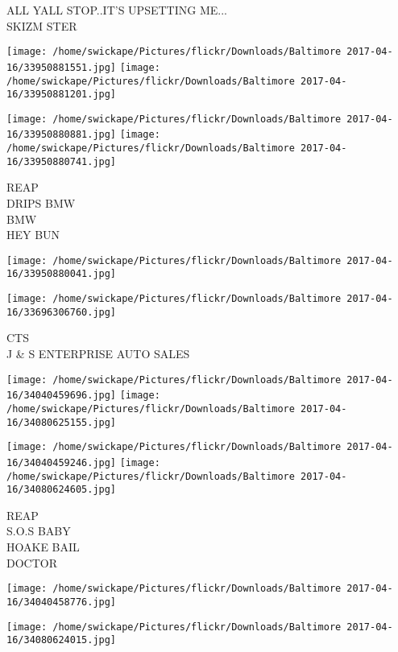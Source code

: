 \documentclass[10pt,letterpaper]{article}
\begin{document}
ALL YALL STOP..IT'S UPSETTING ME...\\
SKIZM STER\\
\pagebreak

\texttt{[image: /home/swickape/Pictures/flickr/Downloads/Baltimore 2017-04-16/33950881551.jpg]}
\texttt{[image: /home/swickape/Pictures/flickr/Downloads/Baltimore 2017-04-16/33950881201.jpg]}

\texttt{[image: /home/swickape/Pictures/flickr/Downloads/Baltimore 2017-04-16/33950880881.jpg]}
\texttt{[image: /home/swickape/Pictures/flickr/Downloads/Baltimore 2017-04-16/33950880741.jpg]}

REAP\\
DRIPS BMW\\
BMW\\
HEY BUN\\
\pagebreak

\texttt{[image: /home/swickape/Pictures/flickr/Downloads/Baltimore 2017-04-16/33950880041.jpg]}

\vspace{0.25in}
\texttt{[image: /home/swickape/Pictures/flickr/Downloads/Baltimore 2017-04-16/33696306760.jpg]}

CTS\\
J \& S ENTERPRISE AUTO SALES\\
\pagebreak

\texttt{[image: /home/swickape/Pictures/flickr/Downloads/Baltimore 2017-04-16/34040459696.jpg]}
\texttt{[image: /home/swickape/Pictures/flickr/Downloads/Baltimore 2017-04-16/34080625155.jpg]}

\texttt{[image: /home/swickape/Pictures/flickr/Downloads/Baltimore 2017-04-16/34040459246.jpg]}
\texttt{[image: /home/swickape/Pictures/flickr/Downloads/Baltimore 2017-04-16/34080624605.jpg]}

REAP\\
S.O.S BABY\\
HOAKE BAIL\\
DOCTOR\\
\pagebreak

\texttt{[image: /home/swickape/Pictures/flickr/Downloads/Baltimore 2017-04-16/34040458776.jpg]}

\vspace{0.25in}
\texttt{[image: /home/swickape/Pictures/flickr/Downloads/Baltimore 2017-04-16/34080624015.jpg]}
\end{document}
